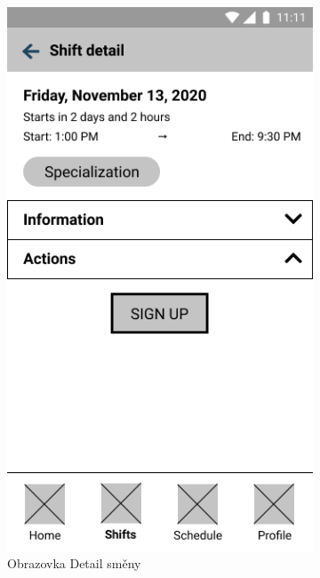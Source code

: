 \documentclass[twoside]{ctuthesis}
\begin{document}
\begin{figure}[h!]
	\centering
	\begin{subfigure}{.45\textwidth}
		\centering
		\includegraphics[scale=.35]{img/shift-detail-up.png}
		\caption{Obrazovka Detail směny}
		\label{fig:shift-detail-up}
	\end{subfigure}
	\begin{subfigure}{.45\textwidth}
		\centering

\end{subfigure}
\end{figure}
\end{document}
